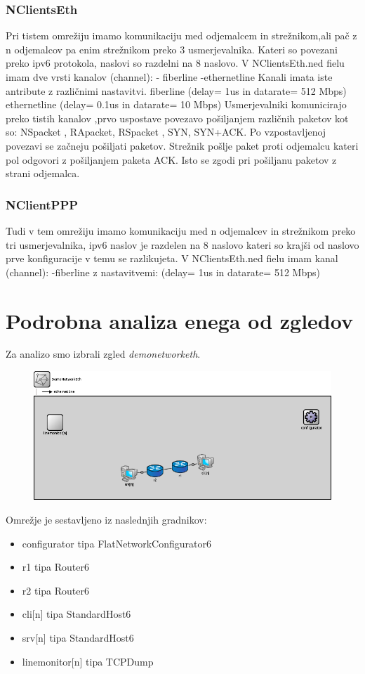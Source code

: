 \documentclass[11pt,a4paper,slovene]{myarticle}
\begin{document}
\subsubsection{NClientsEth}
Pri tistem omrežiju imamo komunikaciju med odjemalcem in strežnikom,ali pač z n odjemalcov pa enim strežnikom preko 3 usmerjevalnika. Kateri so povezani preko  ipv6 protokola, naslovi so razdelni na 8 naslovo.
V NClientsEth.ned fielu imam dve vrsti kanalov (channel):
- fiberline
-ethernetline
Kanali imata iste antribute z različnimi nastavitvi.
            fiberline (delay= 1us in datarate= 512 Mbps)
ethernetline (delay= 0.1us in datarate= 10 Mbps)
Usmerjevalniki komunicirajo preko tistih kanalov ,prvo uspostave povezavo pošiljanjem različnih paketov kot so: NSpacket  , RApacket, RSpacket  , SYN, SYN+ACK. Po vzpostavljenoj povezavi se začneju pošiljati paketov. Strežnik pošlje paket proti odjemalcu kateri pol odgovori z pošiljanjem paketa ACK.  Isto se zgodi pri pošiljanu paketov z strani odjemalca.

\subsubsection{NClientPPP}
Tudi v tem omrežiju imamo komunikaciju med n odjemalcev in strežnikom preko tri usmerjevalnika, ipv6 naslov je razdelen na 8 naslovo kateri so krajši od naslovo prve konfiguracije v temu se razlikujeta.
 V NClientsEth.ned fielu imam  kanal (channel):
            -fiberline z nastavitvemi: (delay= 1us in datarate= 512 Mbps)
 

\section{Podrobna analiza enega od zgledov}
Za analizo smo izbrali zgled \textit{demonetworketh}.
\begin{figure}[H]
\includegraphics[scale=0.5]{slike/demoNetworkEth.png}
\end{figure}
Omrežje je sestavljeno iz naslednjih gradnikov:
\begin{itemize}
\item configurator tipa FlatNetworkConfigurator6
\item r1 tipa Router6
\item r2 tipa Router6
\item cli[n] tipa StandardHost6
\item srv[n] tipa StandardHost6
\item linemonitor[n] tipa TCPDump
\end{itemize}
\end{document}
